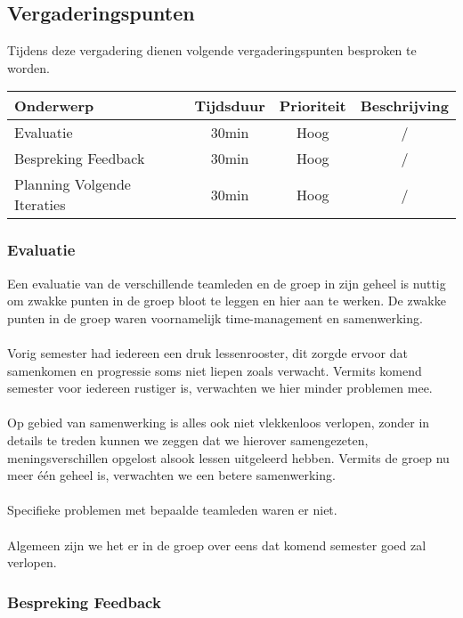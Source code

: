 \subsection{Vergaderingspunten} 
Tijdens deze vergadering dienen volgende vergaderingspunten besproken te worden.
\begin{table} [H]
	\centering
	\begin{tabular} {l|c|c|c}
		Onderwerp & Tijdsduur & Prioriteit & Beschrijving \\ %
		\hline
		Evaluatie & 30min & Hoog & / \\
		Bespreking Feedback & 30min & Hoog & / \\
		Planning Volgende Iteraties & 30min & Hoog & / \\
		
	\end{tabular}
\end{table}

\subsubsection{Evaluatie}
Een evaluatie van de verschillende teamleden en de groep in zijn geheel is nuttig om zwakke punten in de groep bloot te leggen en hier aan te werken. De zwakke punten in de groep waren voornamelijk time-management en samenwerking.
\\
\\
Vorig semester had iedereen een druk lessenrooster, dit zorgde ervoor dat samenkomen en progressie soms niet liepen zoals verwacht. Vermits komend semester voor iedereen rustiger is, verwachten we hier minder problemen mee.
\\
\\
Op gebied van samenwerking is alles ook niet vlekkenloos verlopen, zonder in details te treden kunnen we zeggen dat we hierover samengezeten, meningsverschillen opgelost alsook lessen uitgeleerd hebben. Vermits de groep nu meer één geheel is, verwachten we een betere samenwerking.
\\
\\
Specifieke problemen met bepaalde teamleden waren er niet.
\\
\\
Algemeen zijn we het er in de groep over eens dat komend semester goed zal verlopen.

\subsubsection{Bespreking Feedback}
